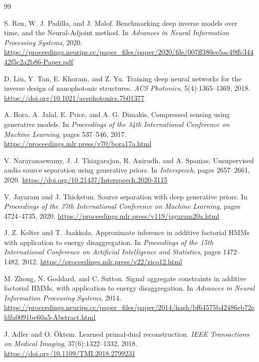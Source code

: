 \documentclass[11pt]{article}
\begin{document}
\begin{thebibliography}{99}

S. Ren, W. J. Padilla, and J. Malof.
\newblock Benchmarking deep inverse models over time, and the Neural-Adjoint method.
\newblock In \emph{Advances in Neural Information Processing Systems}, 2020.
\newblock \url{https://proceedings.neurips.cc/paper_files/paper/2020/file/007ff380ee5ac49ffc34442f5c2a2b86-Paper.pdf}

D. Liu, Y. Tan, E. Khoram, and Z. Yu.
\newblock Training deep neural networks for the inverse design of nanophotonic structures.
\newblock \emph{ACS Photonics}, 5(4):1365--1369, 2018.
\newblock \url{https://doi.org/10.1021/acsphotonics.7b01377}

A. Bora, A. Jalal, E. Price, and A. G. Dimakis.
\newblock Compressed sensing using generative models.
\newblock In \emph{Proceedings of the 34th International Conference on Machine Learning}, pages 537--546, 2017.
\newblock \url{https://proceedings.mlr.press/v70/bora17a.html}

V. Narayanaswamy, J. J. Thiagarajan, R. Anirudh, and A. Spanias.
\newblock Unsupervised audio source separation using generative priors.
\newblock In \emph{Interspeech}, pages 2657--2661, 2020.
\newblock \url{https://doi.org/10.21437/Interspeech.2020-3115}

V. Jayaram and J. Thickstun.
\newblock Source separation with deep generative priors.
\newblock In \emph{Proceedings of the 37th International Conference on Machine Learning}, pages 4724--4735, 2020.
\newblock \url{https://proceedings.mlr.press/v119/jayaram20a.html}

J. Z. Kolter and T. Jaakkola.
\newblock Approximate inference in additive factorial HMMs with application to energy disaggregation.
\newblock In \emph{Proceedings of the 15th International Conference on Artificial Intelligence and Statistics}, pages 1472--1482, 2012.
\newblock \url{https://proceedings.mlr.press/v22/zico12.html}

M. Zhong, N. Goddard, and C. Sutton.
\newblock Signal aggregate constraints in additive factorial HMMs, with application to energy disaggregation.
\newblock In \emph{Advances in Neural Information Processing Systems}, 2014.
\newblock \url{https://proceedings.neurips.cc/paper_files/paper/2014/hash/bf64575b42486eb72efdfa0091be60a5-Abstract.html}

J. Adler and O. \"Oktem.
\newblock Learned primal-dual reconstruction.
\newblock \emph{IEEE Transactions on Medical Imaging}, 37(6):1322--1332, 2018.
\newblock \url{https://doi.org/10.1109/TMI.2018.2799231}


\end{thebibliography}
\end{document}
